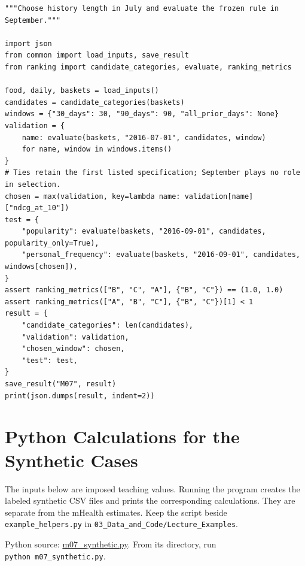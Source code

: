 \begin{Verbatim}[breaklines,breakanywhere,fontsize=\small]
"""Choose history length in July and evaluate the frozen rule in September."""

import json
from common import load_inputs, save_result
from ranking import candidate_categories, evaluate, ranking_metrics

food, daily, baskets = load_inputs()
candidates = candidate_categories(baskets)
windows = {"30_days": 30, "90_days": 90, "all_prior_days": None}
validation = {
    name: evaluate(baskets, "2016-07-01", candidates, window)
    for name, window in windows.items()
}
# Ties retain the first listed specification; September plays no role in selection.
chosen = max(validation, key=lambda name: validation[name]["ndcg_at_10"])
test = {
    "popularity": evaluate(baskets, "2016-09-01", candidates, popularity_only=True),
    "personal_frequency": evaluate(baskets, "2016-09-01", candidates, windows[chosen]),
}
assert ranking_metrics(["B", "C", "A"], {"B", "C"}) == (1.0, 1.0)
assert ranking_metrics(["A", "B", "C"], {"B", "C"})[1] < 1
result = {
    "candidate_categories": len(candidates),
    "validation": validation,
    "chosen_window": chosen,
    "test": test,
}
save_result("M07", result)
print(json.dumps(result, indent=2))
\end{Verbatim}

\hypertarget{M07-python-calculations-for-the-synthetic-cases}{%
\section{Python Calculations for the Synthetic
Cases}\label{M07-python-calculations-for-the-synthetic-cases}}

\noindent The inputs below are imposed teaching values. Running the program
creates the labeled synthetic CSV files and prints the corresponding
calculations. They are separate from the mHealth estimates. Keep the
script beside \texttt{example\_helpers.py} in
\texttt{03\_Data\_and\_Code/Lecture\_Examples}.

\FloatBarrier
{}
Python source:
\href{../03_Data_and_Code/Lecture_Examples/m07_synthetic.py}{m07\_synthetic.py}.
From its directory, run \texttt{python\ m07\_synthetic.py}.

